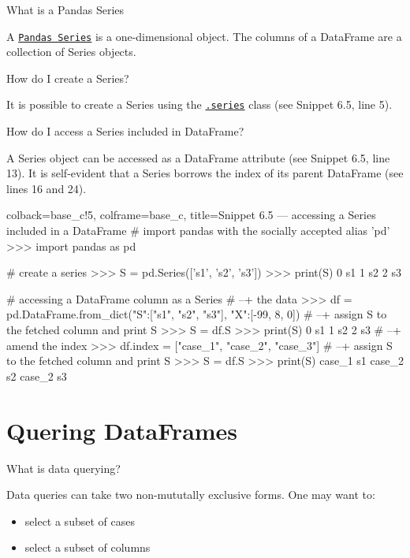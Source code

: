 \documentclass[a4paper,11pt]{book}
\numberwithin{figure}{chapter}
\numberwithin{table}{chapter}
\newcommand{\question}[1]{%
    \begin{tcolorbox}[colback=comp_c!10,colframe=comp_c,sidebyside align=top,width=\linewidth,before skip=1ex]
        #1
    \end{tcolorbox}
    \switchcolumn%
}
\newcommand{\note}[1]{%
    \begin{tcolorbox}[colback=white!0,colframe=white!10,width=\linewidth,before skip=1ex]
        #1
    \end{tcolorbox}
}
\begin{document}
\begin{paracol}{2}
	\question{\raggedright What is a Pandas Series}
	\note{A \href{https://pandas.pydata.org/docs/reference/series.html}{\texttt{Pandas Series}} is a one-dimensional object. The columns of a DataFrame are a collection of Series objects.}
\end{paracol}

\begin{paracol}{2}
	\question{\raggedright How do I create a Series?}
	\note{It is possible to create a Series using the \href{https://pandas.pydata.org/docs/reference/series.html}{\texttt{.series}} class (see Snippet 6.5, line 5).}
\end{paracol}

\begin{paracol}{2}
	\question{\raggedright How do I access a Series included in DataFrame?}
	\note{A Series object can be accessed as a DataFrame attribute (see Snippet 6.5, line 13). It is self-evident that a Series borrows the index of its parent DataFrame (see lines 16 and 24).}
\end{paracol}

\begin{pythoncode}[linenos=True]{colback=base_c!5, colframe=base_c, title=\sffamily Snippet 6.5 --- accessing a Series included in a DataFrame}
# import pandas with the socially accepted alias 'pd'
>>> import pandas as pd

# create a series 
>>> S = pd.Series(['s1', 's2', 's3'])
>>> print(S)
0    s1
1    s2
2    s3

# accessing a DataFrame column as a Series
# --+ the data 
>>> df = pd.DataFrame.from_dict({"S":["s1", "s2", "s3"], "X":[-99, 8, 0]})
# --+ assign S to the fetched column and print S
>>> S = df.S
>>> print(S)
0    s1
1    s2
2    s3
# --+ amend the index
>>> df.index = ["case_1", "case_2", "case_3"]
# --+ assign S to the fetched column and print S
>>> S = df.S
>>> print(S)
case_1    s1
case_2    s2
case_2    s3
\end{pythoncode}

\section{Quering DataFrames}
\label{sec:querying_df}

\begin{paracol}{2}
	\question{\raggedright What is data querying?}
	\note{Data queries can take two non-mututally exclusive forms. One may want to:
	
	\begin{itemize}
		\item select a subset of cases 
		\item select a subset of columns
	\end{itemize}
	}
\end{paracol}
\end{document}
